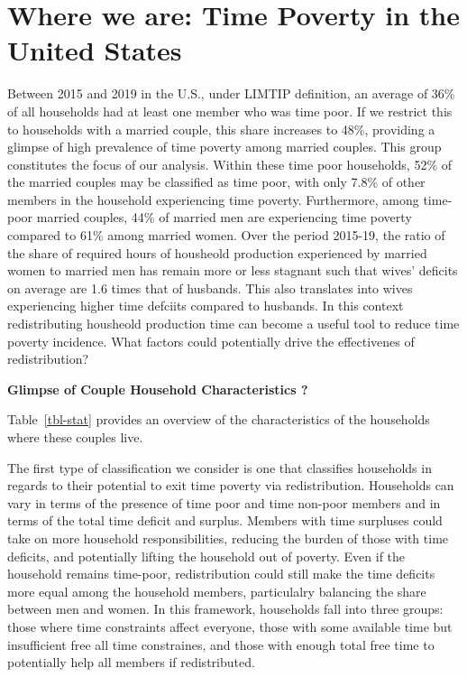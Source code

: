 \documentclass[
  11pt,
]{article}
\begin{document}
\section{Where we are: Time Poverty in the United
States}\label{where-we-are-time-poverty-in-the-united-states}

Between 2015 and 2019 in the U.S., under LIMTIP definition, an average
of 36\% of all households had at least one member who was time poor. If
we restrict this to households with a married couple, this share
increases to 48\%, providing a glimpse of high prevalence of time
poverty among married couples. This group constitutes the focus of our
analysis. Within these time poor households, 52\% of the married couples
may be classified as time poor, with only 7.8\% of other members in the
household experiencing time poverty. Furthermore, among time-poor
married couples, 44\% of married men are experiencing time poverty
compared to 61\% among married women. Over the period 2015-19, the ratio
of the share of required hours of housheold production experienced by
married women to married men has remain more or less stagnant such that
wives' deficits on average are 1.6 times that of husbands. This also
translates into wives experiencing higher time defciits compared to
husbands. In this context redistributing housheold production time can
become a useful tool to reduce time poverty incidence. What factors
could potentially drive the effectivenes of redistribution?

\textbf{Glimpse of Couple Household Characteristics ?}

Table~\ref{tbl-stat} provides an overview of the characteristics of the
households where these couples live.

The first type of classification we consider is one that classifies
households in regards to their potential to exit time poverty via
redistribution. Households can vary in terms of the presence of time
poor and time non-poor members and in terms of the total time deficit
and surplus. Members with time surpluses could take on more household
responsibilities, reducing the burden of those with time deficits, and
potentially lifting the household out of poverty. Even if the household
remains time-poor, redistribution could still make the time deficits
more equal among the household members, particulalry balancing the share
between men and women. In this framework, households fall into three
groups: those where time constraints affect everyone, those with some
available time but insufficient free all time constraines, and those
with enough total free time to potentially help all members if
redistributed.
\end{document}
